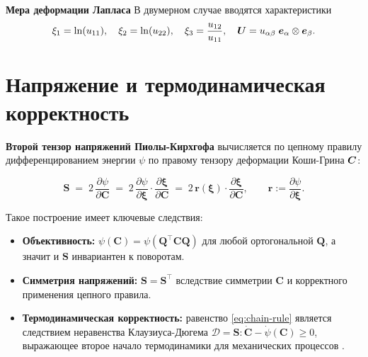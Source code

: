 \textbf{Мера деформации Лапласа}
В двумерном случае вводятся характеристики
\begin{equation}
\xi_1 = \ln(u_{11}),\quad \xi_2 = \ln(u_{22}),\quad \xi_3 = \frac{u_{12}}{u_{11}}, 
\quad \boldsymbol{U} = u_{\alpha\beta} \; \boldsymbol{e}_{\alpha} \otimes \boldsymbol{e}_{\beta}.
\label{eq:laplace_coords}
\end{equation}



\section{Напряжение и термодинамическая корректность}
\textbf{Второй тензор напряжений Пиолы-Кирхгофа} вычисляется по цепному правилу дифференцированием энергии \(\psi\) 
по правому тензору деформации Коши-Грина \(\boldsymbol{C}\):

\begin{equation}
  \mathbf{S} \;=\; 2\,\frac{\partial \psi}{\partial \mathbf{C}}
  \;=\; 2\,\frac{\partial \psi}{\partial \boldsymbol\xi} \cdot \frac{\partial \boldsymbol\xi}{\partial \mathbf{C}}
  \;=\; 2\,\mathbf{r}(\boldsymbol\xi)\cdot\frac{\partial \boldsymbol\xi}{\partial \mathbf{C}},
  \qquad \mathbf{r}:=\frac{\partial \psi}{\partial \boldsymbol\xi}.
  \label{eq:chain-rule}
\end{equation}

Такое построение имеет ключевые следствия:
\begin{itemize}
  \item \textbf{Объективность:} $\psi(\mathbf{C})=\psi(\mathbf{Q}^\top\mathbf{C}\mathbf{Q})$ для любой ортогональной $\mathbf{Q}$, а значит и $\mathbf{S}$ инвариантен к поворотам.
  \item \textbf{Симметрия напряжений:} $\mathbf{S}=\mathbf{S}^\top$ вследствие симметрии $\mathbf{C}$ и корректного применения цепного правила.
  \item \textbf{Термодинамическая корректность:} равенство \eqref{eq:chain-rule} является следствием неравенства Клаузиуса-Дюгема 
  $\mathcal{D} = \mathbf{S} : \dot{\mathbf{C}} - \dot{\psi}(\mathbf{C}) \geq 0$, 
  выражающее второе начало термодинамики для механических процессов \cite{truesdell1984historical,truesdell2004nonlinear}.
\end{itemize}

